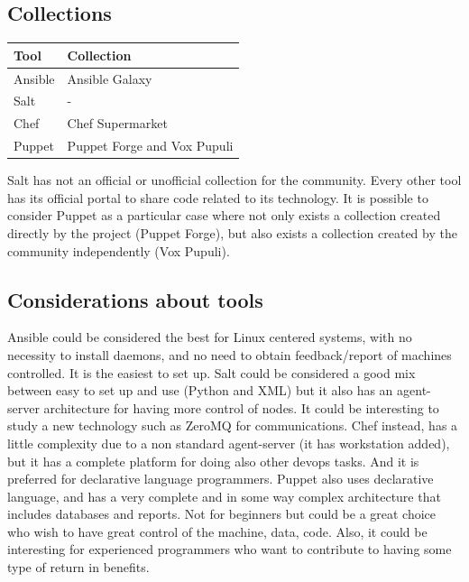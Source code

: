 \documentclass[12pt,a4paper,openright,twoside]{book}
\begin{document}
\subsection{Collections}
\begin{table}[H]
    \begin{tabular}{|l|l|}
    \hline
    \textbf{Tool} & \textbf{Collection}                            \\ \hline
    Ansible       & Ansible Galaxy                                 \\ \hline
    Salt          & -                                              \\ \hline
    Chef          & Chef Supermarket                               \\ \hline
    Puppet        & Puppet Forge and Vox Pupuli                    \\ \hline
    \end{tabular}
\end{table}
Salt has not an official or unofficial collection for the community.
Every other tool has its official portal to share code related to its technology.
It is possible to consider Puppet as a particular case where not only exists a collection created directly by the project (Puppet Forge), but also exists a collection created by the community independently (Vox Pupuli).

\subsection{Considerations about tools}
Ansible could be considered the best for Linux centered systems, with no necessity to install daemons, and no need to obtain feedback/report of machines controlled. It is the easiest to set up.
Salt could be considered a good mix between easy to set up and use (Python and XML) but it also has an agent-server architecture for having more control of nodes. It could be interesting to study a new technology such as ZeroMQ for communications.
Chef instead, has a little complexity due to a non standard agent-server (it has workstation added), but it has a complete platform for doing also other devops tasks. And it is preferred for declarative language programmers.
Puppet also uses declarative language, and has a very complete and in some way complex architecture that includes databases and reports. Not for beginners but could be a great choice who wish to have great control of the machine, data, code. Also, it could be interesting for experienced programmers who want to contribute to having some type of return in benefits.
\end{document}
